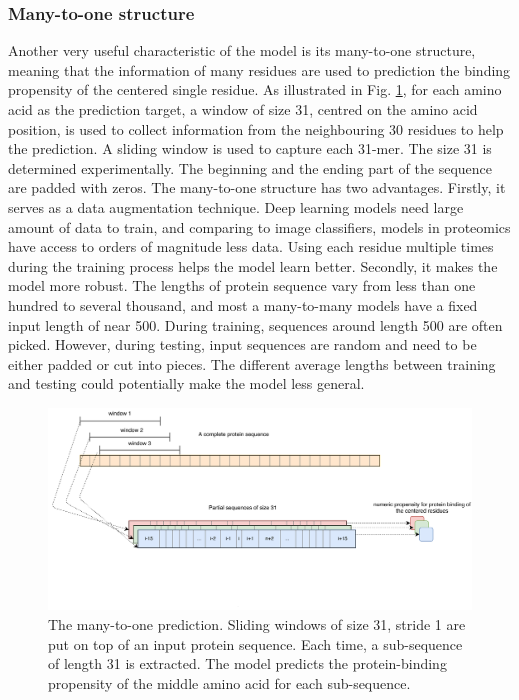 \subsubsection{Many-to-one structure}
Another very useful characteristic of the model is its many-to-one structure, meaning that the information of many residues are used to prediction the binding propensity of the centered single residue. As illustrated in Fig. \ref{fig_many2one}, for each amino acid as the prediction target, a window of size 31, centred on the amino acid position, is used to collect information from the neighbouring 30 residues to help the prediction. A sliding window is used to capture each 31-mer. The size 31 is determined experimentally. The beginning and the ending part of the sequence are padded with zeros. The many-to-one structure has two advantages. Firstly, it serves as a data augmentation technique. Deep learning models need large amount of data to train, and comparing to image classifiers, models in proteomics have access to orders of magnitude less data. Using each residue multiple times during the training process helps the model learn better. Secondly, it makes the model more robust. The lengths of protein sequence vary from less than one hundred to several thousand, and most a many-to-many models have a fixed input length of near 500. During training, sequences around length 500 are often picked. However, during testing, input sequences are random and need to be either padded or cut into pieces. The different average lengths between training and testing could potentially make the model less general. 
\begin{figure}
\centering
\includegraphics[width=\textwidth]{img/many_2_one.pdf}
  \caption[The many-to-one prediction]{The many-to-one prediction. Sliding windows of size 31, stride 1 are put on top of an input protein sequence. Each time, a sub-sequence of length 31 is extracted. The model predicts the protein-binding propensity of the middle amino acid for each sub-sequence.
  \label{fig_many2one}}
\end{figure}
